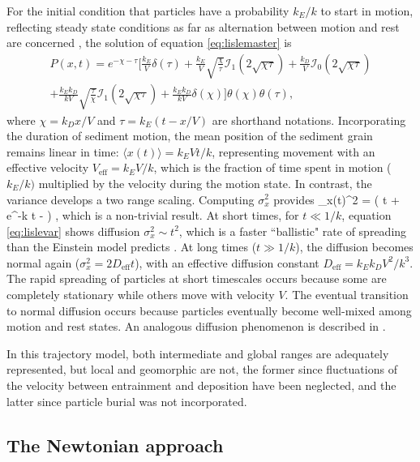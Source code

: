 For the initial condition that particles have a probability $k_E/k$ to start in motion, reflecting steady state conditions as far as alternation between motion and rest are concerned \citep[e.g.][]{Ancey2006}, the solution of equation \ref{eq:lislemaster} is \citep{Lisle1998}
\begin{multline}  P(x,t) =  e^{-\chi-\tau} \Big[ \frac{k_E}{V}\delta(\tau) + \frac{k_E}{V} \sqrt{\frac{\chi}{\tau}}\mathcal{I}_1(2\sqrt{\chi\tau}) + \frac{k_D}{V}\mathcal{I}_0(2\sqrt{\chi\tau}) \\
	+ \frac{k_Ek_D}{kV}\sqrt{\frac{\tau}{\chi}}\mathcal{I}_1(2\sqrt{\chi\tau}) + \frac{k_Ek_D}{kV} \delta(\chi)
	\Big]\theta(\chi)\theta(\tau), \label{eq:lisledist}
\end{multline}
where $\chi = k_D x/V$ and $\tau = k_E(t-x/V)$ are shorthand notations.
Incorporating the duration of sediment motion, the mean position of the sediment grain remains linear in time: $\langle x (t) \rangle  = k_E V t/k$, representing movement with an effective velocity $V_\text{eff} = k_E V/k$, which is the fraction of time spent in motion ($k_E/k)$ \citep{Ancey2006} multiplied by the velocity during the motion state. In contrast, the variance develops a two range scaling.
Computing $\sigma_x^2$ provides
\be \sigma_x(t)^2 = \Big( t + e^{-k t} - \Big) , \label{eq:lislevar}\ee
which is a non-trivial result. At short times, for $t\ll 1/k$, equation \ref{eq:lislevar} shows diffusion $\sigma_x^2 \sim t^2$, which is a faster ``ballistic" rate of spreading than the Einstein model predicts \citep{Sokolov2012}. At long times ($t\gg 1/k$), the diffusion becomes normal again ($\sigma_x^2 = 2 D_\text{eff} t$), with an effective diffusion constant $ D_\text{eff} = k_E k_D V^2/k^3$. 
The rapid spreading of particles at short timescales occurs because some are completely stationary while others move with velocity $V$. The eventual transition to normal diffusion occurs because particles eventually become well-mixed among motion and rest states. An analogous diffusion phenomenon is described in \citet{Taylor1920}.

In this trajectory model, both intermediate and global ranges are adequately represented, but local and geomorphic are not, the former since fluctuations of the velocity between entrainment and deposition have been neglected, and the latter since particle burial was not incorporated.

\subsection{The Newtonian approach}

